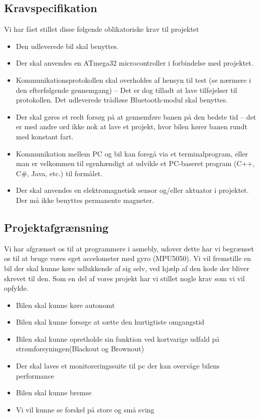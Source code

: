 \subsection{Kravspecifikation}

Vi har fået stillet disse følgende oblikatoriske krav til projektet

\begin{itemize}
	\item Den udleverede bil skal benyttes.
	\item Der skal anvendes en ATmega32 microcontroller i forbindelse med projektet.
	\item Kommunikationsprotokollen skal overholdes af hensyn til test (se nærmere i den efterfølgende gennemgang) – Det er dog tilladt at lave tilføjelser til protokollen. Det udleverede trådløse Bluetooth-modul skal benyttes.
	\item Der skal gøres et reelt forsøg på at gennemføre banen på den bedste tid – det er med andre ord ikke nok at lave et projekt, hvor bilen kører banen rundt med konstant fart.
	\item Kommunikation mellem PC og bil kan foregå via et terminalprogram, eller man er velkommen til egenhændigt at udvikle et PC-baseret program (C++, C\#, Java, etc.) til formålet.
	\item Der skal anvendes en elektromagnetisk sensor og/eller aktuator i projektet. Der må ikke benyttes permanente magneter.
\end{itemize}


\subsection{Projektafgrænsning}

Vi har afgrænset os til at programmere i asmebly, udover dette har vi begrænset os til at bruge vores eget accelometer med gyro (MPU5050).
Vi vil fremstille en bil der skal kunne køre udlukkende af sig selv, ved hjælp af den kode der bliver skrevet til den.
Som en del af vores projekt har vi stillet nogle krav som vi vil opfylde.

\begin{itemize}
	\item Bilen skal kunne køre autonomt
	\item Bilen skal kunne forsøge at sætte den hurtigtiste omgangstid
	\item Bilen skal kunne opretholde sin funktion ved kortvarige udfald på strømforsyningen(Blackout og Brownout)
	\item Der skal laves et monitoreringssuite til pc der kan overvåge bilens performance
	\item Bilen skal kunne bremse
	\item Vi vil kunne se forskel på store og små sving
\end{itemize}

